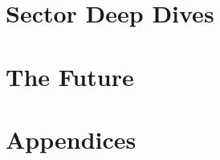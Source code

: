 \documentclass{book}
\begin{document}
\part{Sector Deep Dives}










\part{The Future}



\appendix
\part{Appendices}




\backmatter
\printbibliography
\end{document}
